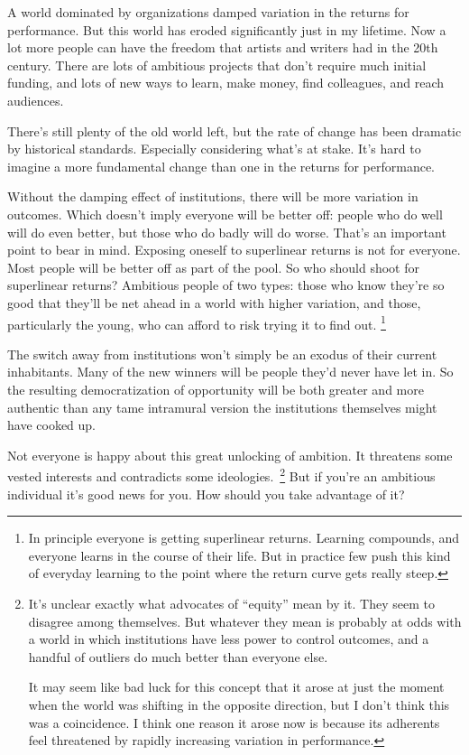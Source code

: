 A world dominated by organizations damped variation in the returns for
performance. But this world has eroded significantly just in my
lifetime. Now a lot more people can have the freedom that artists and
writers had in the 20th century. There are lots of ambitious projects
that don't require much initial funding, and lots of new ways to learn,
make money, find colleagues, and reach audiences.

There's still plenty of the old world left, but the rate of change has
been dramatic by historical standards. Especially considering what's at
stake. It's hard to imagine a more fundamental change than one in the
returns for performance.

Without the damping effect of institutions, there will be more variation
in outcomes. Which doesn't imply everyone will be better off: people who
do well will do even better, but those who do badly will do worse.
That's an important point to bear in mind. Exposing oneself to
superlinear returns is not for everyone. Most people will be better off
as part of the pool. So who should shoot for superlinear returns?
Ambitious people of two types: those who know they're so good that
they'll be net ahead in a world with higher variation, and those,
particularly the young, who can afford to risk trying it to find out.
\footnote{In principle everyone is getting superlinear returns. Learning
compounds, and everyone learns in the course of their life. But in
practice few push this kind of everyday learning to the point where the
return curve gets really steep.}

The switch away from institutions won't simply be an exodus of their
current inhabitants. Many of the new winners will be people they'd never
have let in. So the resulting democratization of opportunity will be
both greater and more authentic than any tame intramural version the
institutions themselves might have cooked up.

Not everyone is happy about this great unlocking of ambition. It
threatens some vested interests and contradicts some
ideologies.~\footnote{It's unclear exactly what advocates of ``equity'' mean by it.
They seem to disagree among themselves. But whatever they mean is
probably at odds with a world in which institutions have less power to
control outcomes, and a handful of outliers do much better than everyone
else.

It may seem like bad luck for this concept that it arose at just the
moment when the world was shifting in the opposite direction, but I
don't think this was a coincidence. I think one reason it arose now is
because its adherents feel threatened by rapidly increasing variation in
performance.} But if you're an ambitious
individual it's good news for you. How should you take advantage of it?

